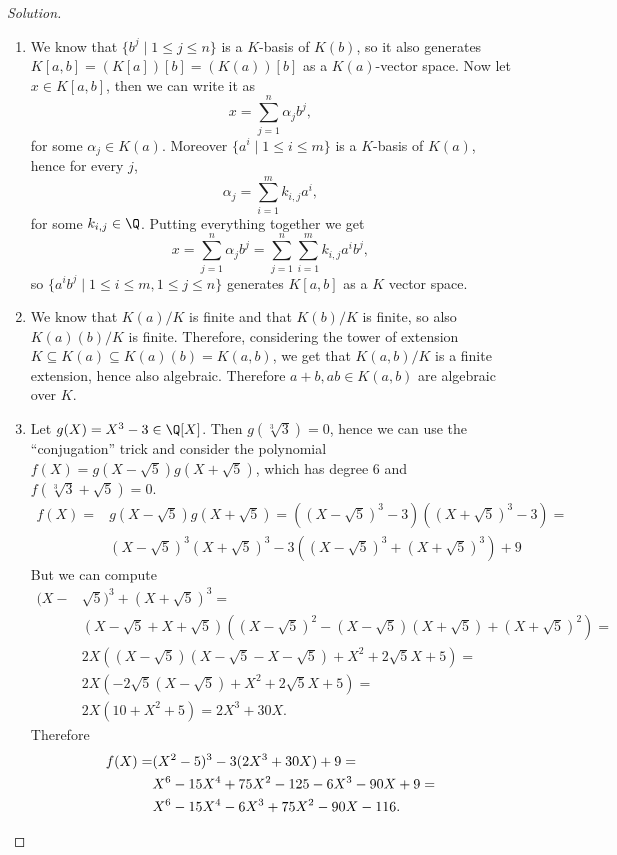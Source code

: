 \documentclass[a4paper,10pt,reqno]{amsart}
\newenvironment{sol}
  {\renewcommand\qedsymbol{$\blacksquare$}\begin{proof}[Solution]}
  {\end{proof}}
\begin{document}
\begin{sol}~

\begin{enumerate}
    \item We know that 
    $\{b^j\mid 1\leq j\leq n\}$ is a 
    $K$-basis of $K(b)$, so it also generates
    $K[a,b]=(K[a])[b]=(K(a))[b]$ as a $K(a)$-vector space.
    Now let $x\in K[a,b]$, then we can write it as
    \[
    x=
    \sum_{j=1}^n \alpha_j b^j,
    \]
    for some $\alpha_j\in K(a)$.
    Moreover $\{a^i\mid 1\leq i\leq m\}$ is a 
    $K$-basis of $K(a)$, hence for every $j$,
    \[
    \alpha_j=\sum_{i=1}^m k_{i,j} a^i,
    \]
    for some $k_{i,j}\in \Q$.
    Putting everything together we get
    \[
    x=
    \sum_{j=1}^n \alpha_j b^j=
    \sum_{j=1}^n \sum_{i=1}^m k_{i,j} a^i b^j,
    \]
    so $\{a^ib^j\mid 1 \leq i \leq m, 1 \leq j \leq n\}$
    generates $K[a,b]$ as a $K$ vector space.
    \item We know that $K(a)/K$ is finite and that $K(b)/K$ is finite, so also $K(a)(b)/K$ is finite.
    Therefore, considering the tower of extension 
    $K\subseteq K(a)\subseteq K(a)(b)=K(a,b)$,
    we get that $K(a,b)/K$ is a finite extension, hence 
    also algebraic.
    Therefore $a+b,ab\in K(a,b)$ are algebraic over $K$.
    \item Let $g(X)=X^3-3\in\Q[X]$. 
    Then $g(\sqrt[3]{3})=0$, hence we can use the 
    ``conjugation'' trick and consider the polynomial 
    $f(X)=g(X-\sqrt{5})g(X+\sqrt{5})$, which has 
    degree 6 and $f(\sqrt[3]{3} + \sqrt{5})=0$.
    \begin{align*}
        f(X)=&g(X-\sqrt{5})g(X+\sqrt{5})=
        ((X-\sqrt{5})^3-3)((X+\sqrt{5})^3-3)=\\
        &(X-\sqrt{5})^3(X+\sqrt{5})^3-3((X-\sqrt{5})^3+(X+\sqrt{5})^3)+9
    \end{align*}
    But we can compute 
    \begin{align*}
        (X-&\sqrt{5})^3+(X+\sqrt{5})^3=\\
        &(X-\sqrt{5}+X+\sqrt{5})((X-\sqrt{5})^2
        -(X-\sqrt{5})(X+\sqrt{5})+(X+\sqrt{5})^2)=\\
        &2X((X-\sqrt{5})(X-\sqrt{5}-X-\sqrt{5})+X^2+2\sqrt{5}X+5)=\\
        &2X(-2\sqrt{5}(X-\sqrt{5})+X^2+2\sqrt{5}X+5)=\\
        &2X(10+X^2+5)=2X^3+30X.
    \end{align*}
    Therefore 
    \begin{align*}
        f(X)=&
        (X^2-5)^3-3(2X^3+30X)+9=\\
        &X^6-15X^4+75X^2-125-6X^3-90X+9=\\
        &X^6-15X^4-6X^3+75X^2-90X-116.\qedhere
    \end{align*}
\end{enumerate}   
\end{sol}
\end{document}
